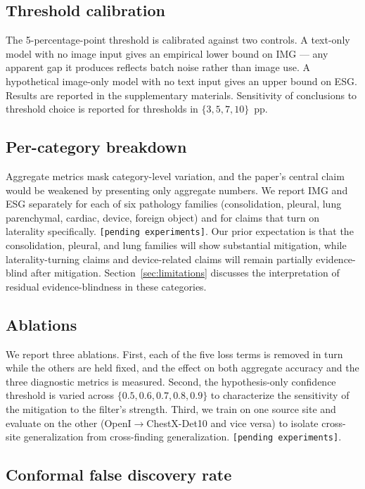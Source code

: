 \documentclass[11pt]{article}
\begin{document}
\subsection{Threshold calibration}
\label{sec:threshold}

The 5-percentage-point threshold is calibrated against two controls. A text-only model with no image input gives an empirical lower bound on IMG --- any apparent gap it produces reflects batch noise rather than image use. A hypothetical image-only model with no text input gives an upper bound on ESG. Results are reported in the supplementary materials. Sensitivity of conclusions to threshold choice is reported for thresholds in $\{3, 5, 7, 10\}$~pp.

\subsection{Per-category breakdown}

Aggregate metrics mask category-level variation, and the paper's central claim would be weakened by presenting only aggregate numbers. We report IMG and ESG separately for each of six pathology families (consolidation, pleural, lung parenchymal, cardiac, device, foreign object) and for claims that turn on laterality specifically. \texttt{[pending experiments]}. Our prior expectation is that the consolidation, pleural, and lung families will show substantial mitigation, while laterality-turning claims and device-related claims will remain partially evidence-blind after mitigation. Section~\ref{sec:limitations} discusses the interpretation of residual evidence-blindness in these categories.

\subsection{Ablations}

We report three ablations. First, each of the five loss terms is removed in turn while the others are held fixed, and the effect on both aggregate accuracy and the three diagnostic metrics is measured. Second, the hypothesis-only confidence threshold is varied across $\{0.5, 0.6, 0.7, 0.8, 0.9\}$ to characterize the sensitivity of the mitigation to the filter's strength. Third, we train on one source site and evaluate on the other (OpenI$\to$ChestX-Det10 and vice versa) to isolate cross-site generalization from cross-finding generalization. \texttt{[pending experiments]}.

\subsection{Conformal false discovery rate}
\end{document}
